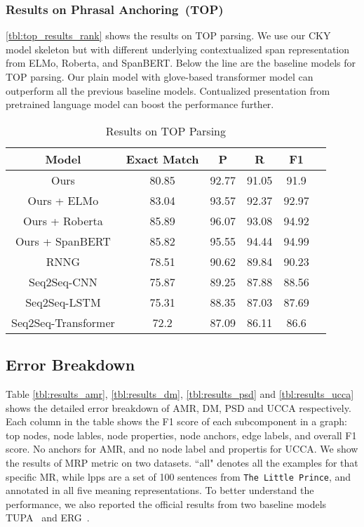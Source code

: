 \subsubsection{Results on Phrasal Anchoring~(TOP)}
\label{sssec:lex-phr:top-results}
\autoref{tbl:top_results_rank} shows the results on TOP parsing. We
use our CKY model skeleton but with different underlying
contextualized span representation from ELMo, Roberta, and
SpanBERT. Below the line are the baseline models for TOP parsing. Our
plain model with glove-based transformer model can outperform all the
previous baseline models. Contualized presentation from pretrained
language model can boost the performance further.

\begin{table}[!h]
\caption{\label{tbl:top_results_rank} Results on TOP Parsing}
  \small
\centering
\begin{tabular}{cccccc}
  \toprule
  Model           & Exact Match & P     & R     & F1    \\ \hline
  Ours            & 80.85       & 92.77 & 91.05 & 91.9  \\
  Ours + ELMo     & 83.04       & 93.57 & 92.37 & 92.97 \\
  Ours + Roberta  & 85.89       & 96.07 & 93.08 & 94.92 \\
  Ours + SpanBERT & 85.82       & 95.55 & 94.44 & 94.99 \\ \hline
  RNNG                & 78.51       & 90.62 & 89.84 & 90.23 \\
  Seq2Seq-CNN         & 75.87       & 89.25 & 87.88 & 88.56 \\
  Seq2Seq-LSTM        & 75.31       & 88.35 & 87.03 & 87.69 \\
  Seq2Seq-Transformer & 72.2        & 87.09 & 86.11 & 86.6  \\
  \bottomrule
\end{tabular}
\end{table}

\subsection{Error Breakdown}
\label{ssec:error_breakdown}
Table \ref{tbl:results_amr}, \ref{tbl:results_dm},
\ref{tbl:results_psd} and \ref{tbl:results_ucca} shows the detailed
error breakdown of AMR, DM, PSD and UCCA respectively. Each column in
the table shows the F1 score of each subcomponent in a graph: top
nodes, node lables, node properties, node anchors, edge labels, and
overall F1 score. No anchors for AMR, and no node label and propertis
for UCCA. We show the results of MRP metric on two datasets. ``all"
denotes all the examples for that specific MR, while lpps are a set of
100 sentences from \texttt{The Little Prince}, and annotated in all five
meaning representations. To better understand the performance, we also
reported the official results from two baseline models
TUPA~\cite{Her:Arv:19} and ERG~\cite{Oep:Fli:19}.

